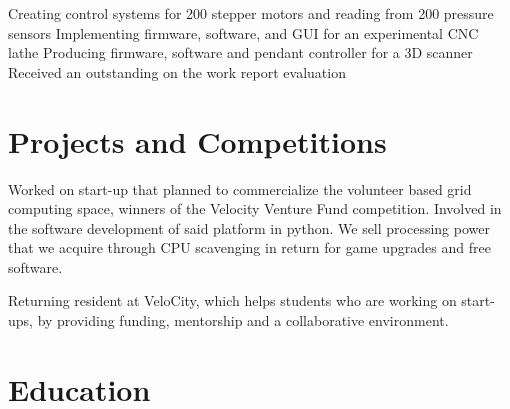 \documentclass[11pt,a4paper]{moderncv}
\begin{document}
{Creating control systems for 200 stepper motors and reading from 200 pressure sensors
    \newline{}Implementing firmware, software, and GUI for an experimental CNC lathe
    \newline{}Producing firmware, software and pendant controller for a 3D scanner
\newline{}Received an outstanding on the work report evaluation}

\section{Projects and Competitions}
{Worked on start-up that planned to commercialize the volunteer based grid computing space, winners of the Velocity Venture Fund competition.
\newline{}Involved in the software development of said platform in python.
\newline{}We sell processing power that we acquire through CPU scavenging in return for game upgrades and free software.}

{Returning resident at VeloCity, which helps students who are working on start-ups, by providing funding, mentorship and a collaborative environment.}

\section{Education}
\end{document}
